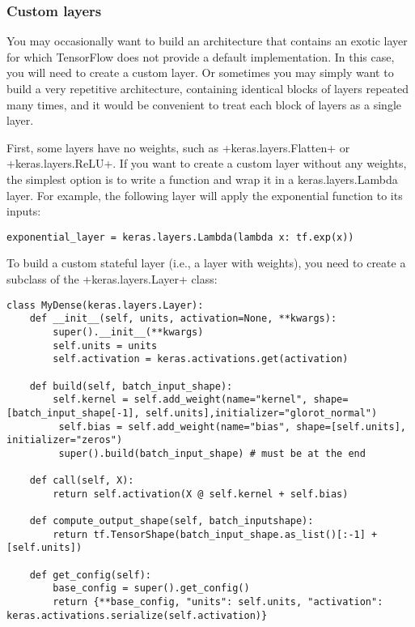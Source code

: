 \subsubsection{Custom layers}
You may occasionally want to build an architecture that contains an exotic layer for which TensorFlow does not provide a default implementation. In this case, you will need to create a custom layer. Or sometimes you may simply want to build a very repetitive architecture, containing identical blocks of layers repeated many times, and it would be convenient to treat each block of layers as a single layer.

First, some layers have no weights, such as \cd+keras.layers.Flatten+ or \cd+keras.layers.ReLU+. If you want to create a custom layer without any weights, the simplest option is to write a function and wrap it in a keras.layers.Lambda layer. For example, the following layer will apply the exponential function to its inputs:

\begin{lstlisting}
exponential_layer = keras.layers.Lambda(lambda x: tf.exp(x))
\end{lstlisting}
To build a custom stateful layer (i.e., a layer with weights), you need to create a subclass of the \cd+keras.layers.Layer+ class:
\begin{lstlisting}
class MyDense(keras.layers.Layer):
	def __init__(self, units, activation=None, **kwargs):
		super().__init__(**kwargs)
		self.units = units
		self.activation = keras.activations.get(activation)
		
	def build(self, batch_input_shape): 
		self.kernel = self.add_weight(name="kernel", shape=[batch_input_shape[-1], self.units],initializer="glorot_normal")
         self.bias = self.add_weight(name="bias", shape=[self.units], initializer="zeros") 	
         super().build(batch_input_shape) # must be at the end

	def call(self, X):
		return self.activation(X @ self.kernel + self.bias)

	def compute_output_shape(self, batch_inputshape):
		return tf.TensorShape(batch_input_shape.as_list()[:-1] + [self.units])	

	def get_config(self):
		base_config = super().get_config()
		return {**base_config, "units": self.units, "activation": keras.activations.serialize(self.activation)}
\end{lstlisting}
